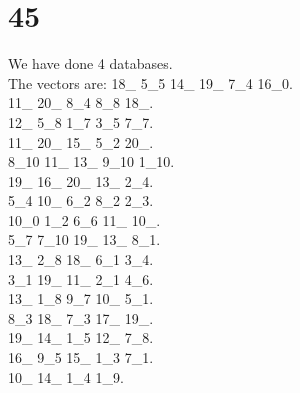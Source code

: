 \chapter{45}
\indent We have done 4 databases.\\
The vectors are:
18\_ 5\_5 14\_ 19\_ 7\_4 16\_0.\\11\_ 20\_ 8\_4 8\_8 18\_.\\12\_ 5\_8 1\_7 3\_5 7\_7.\\11\_ 20\_ 15\_ 5\_2 20\_.\\8\_10 11\_ 13\_ 9\_10 1\_10.\\19\_ 16\_ 20\_ 13\_ 2\_4.\\5\_4 10\_ 6\_2 8\_2 2\_3.\\10\_0 1\_2 6\_6 11\_ 10\_.\\5\_7 7\_10 19\_ 13\_ 8\_1.\\13\_ 2\_8 18\_ 6\_1 3\_4.\\3\_1 19\_ 11\_ 2\_1 4\_6.\\13\_ 1\_8 9\_7 10\_ 5\_1.\\8\_3 18\_ 7\_3 17\_ 19\_.\\19\_ 14\_ 1\_5 12\_ 7\_8.\\16\_ 9\_5 15\_ 1\_3 7\_1.\\10\_ 14\_ 1\_4 1\_9.\\